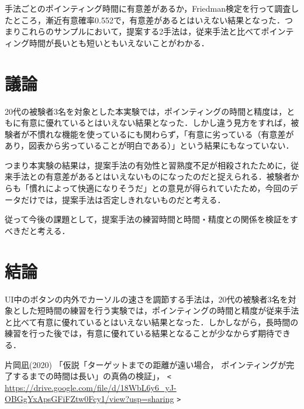 \documentclass[a4paper, papersize, titlepage]{jsarticle}
\begin{document}
\begin{multicols}{2}
手法ごとのポインティング時間に有意差があるか，Friedman検定を行って調査したところ，漸近有意確率0.552で，有意差があるとはいえない結果となった．つまりこれらのサンプルにおいて，提案する2手法は，従来手法と比べてポインティング時間が長いとも短いともいえないことがわかる．


\section{議論}
20代の被験者3名を対象とした本実験では，ポインティングの時間と精度は，ともに有意に優れているとはいえない結果となった．しかし違う見方をすれば，被験者が不慣れな機能を使っているにも関わらず，「有意に劣っている（有意差があり，図表から劣っていることが明白である）」という結果にもなっていない．

つまり本実験の結果は，提案手法の有効性と習熟度不足が相殺されたために，従来手法との有意差があるとはいえないものになったのだと捉えられる．被験者からも「慣れによって快適になりそうだ」との意見が得られていたため，今回のデータだけでは，提案手法は否定しきれないものだと考える．

従って今後の課題として，提案手法の練習時間と時間・精度との関係を検証をすべきだと考える．


\section{結論}
UI中のボタンの内外でカーソルの速さを調節する手法は，20代の被験者3名を対象とした短時間の練習を行う実験では，ポインティングの時間と精度が従来手法と比べて有意に優れているとはいえない結果となった．しかしながら，長時間の練習を行った後では，有意に優れている結果となることが少なからず期待できる．


\begin{thebibliography}{99}

片岡凪(2020)
「仮説「ターゲットまでの距離が遠い場合，
ポインティングが完了するまでの時間は長い」の真偽の検証」，
\verb|<| \url{https://drive.google.com/file/d/18WbL6y6_yJ-OBGgYxApsGFiFZtw0Fcy1/view?usp=sharing} \verb|>|

\end{thebibliography}

\end{multicols}
\end{document}
